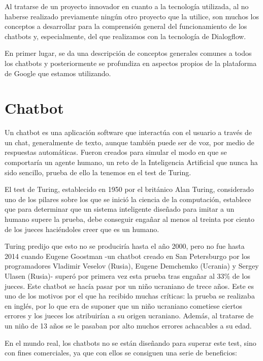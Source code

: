 
Al tratarse de un proyecto innovador en cuanto a la tecnología utilizada, al no haberse realizado previamente ningún otro proyecto que la utilice, son muchos los conceptos a desarrollar para la comprensión general del funcionamiento de los chatbots y, especialmente, del que realizamos con la tecnología de Dialogflow.

En primer lugar, se da una descripción de conceptos generales comunes a todos los chatbots y posteriormente se profundiza en aspectos propios de la plataforma de Google que estamos utilizando.

\section{Chatbot}

Un chatbot es una aplicación software que interactúa con el usuario a través de un chat, generalmente de texto, aunque también puede ser de voz, por medio de respuestas automáticas. 
Fueron creados para simular el modo en que se comportaría un agente humano, un reto de la Inteligencia Artificial que nunca ha sido sencillo, prueba de ello la tenemos en el test de Turing.

El test de Turing, establecido en 1950 por el británico Alan Turing, considerado uno de los pilares sobre los que se inició la ciencia de la computación, establece que para determinar que un sistema inteligente diseñado para imitar a un humano supere la prueba, debe conseguir engañar al menos al treinta por ciento de los jueces haciéndoles creer que es un humano.

Turing predijo que esto no se produciría hasta el año 2000, pero no fue hasta 2014 cuando Eugene Goostman -un chatbot creado en San Petersburgo por los programadores Vladimir Veselov (Rusia), Eugene Demchemko (Ucrania) y Sergey Ulasen (Rusia)- superó por primera vez esta prueba tras engañar al 33\% de los jueces.
Este chatbot se hacía pasar por un niño ucraniano de trece años. Este es uno de los motivos por el que ha recibido muchas críticas: la prueba se realizaba en inglés, por lo que era de suponer que un niño ucraniano cometiese ciertos errores y los jueces los atribuirían a su origen ucraniano. Además, al tratarse de un niño de 13 años se le pasaban por alto muchos errores achacables a su edad. \cite{wiki:eugene}

En el mundo real, los chatbots no se están diseñando para superar este test, sino con fines comerciales, ya que con ellos se consiguen una serie de beneficios:

